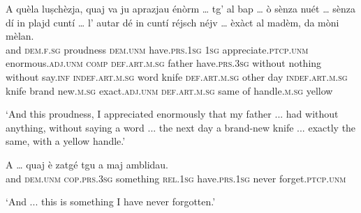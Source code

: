 \begin{linenumbers}
	\gll A quèla luṣchèzja, quaj va ju aprazjau énòrm … tg’ al bap … ò sènza nuét … sènza dí in plajd\footnotemark{} cuntí … l’ autar dé in cuntí réjsch néjv … èxàct al madèm, da mòni mèlan.\\    and \textsc{dem.f.sg} proudness \textsc{dem.unm} have.\textsc{prs.1sg} \textsc{1sg} appreciate.\textsc{ptcp.unm} enormous.\textsc{adj.unm} {} \textsc{comp} \textsc{def.art.m.sg} father {} have.\textsc{prs.3sg} without nothing {} without say.\textsc{inf} \textsc{indef.art.m.sg} word knife {} \textsc{def.art.m.sg} other day \textsc{indef.art.m.sg} knife brand new.\textsc{m.sg} {} exact.\textsc{adj.unm} \textsc{def.art.m.sg} same of handle.\textsc{m.sg} yellow\\
\end{linenumbers}
\medskip
\glt `And this proudness, I appreciated enormously that my father ... had without anything, without saying a word ... the next day a brand-new knife ... exactly the same, with a yellow handle.'
\medskip

\begin{linenumbers}
	\gll A … quaj è zatgé tgu a maj amblidau.   \\
and {} \textsc{dem.unm} \textsc{cop.prs.3sg} something \textsc{rel.1sg} have.\textsc{prs.1sg} never forget.\textsc{ptcp.unm}	\\
\end{linenumbers}
\medskip
\glt `And ... this is something I have never forgotten.'
\medskip


